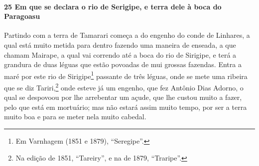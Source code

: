 \paragraph{25 Em que se declara o rio de Serigipe, e terra dele à boca do Paragoasu}

Partindo com a terra de Tamarari começa a do engenho do conde de Linhares, a qual está
muito metida para dentro fazendo uma maneira de enseada, a que chamam Mairape, a qual vai
correndo até a boca do rio de Sirigipe, e terá a grandura de duas léguas que estão
povoadas de mui grossas fazendas. Entra a maré por este rio de Sirigipe\footnote{ Em
Varnhagem (1851 e 1879), ``Seregipe''.} passante de três léguas, onde se mete uma ribeira
que se diz Tariri,\footnote{ Na edição de 1851, ``Tareiry'', e na de 1879, ``Traripe''.}
onde esteve já um engenho, que fez Antônio Dias Adorno, o qual se despovoou por lhe
arrebentar um açude, que lhe custou muito a fazer, pelo que está em mortuário;
mas não estará assim muito tempo, por ser a terra muito boa e
para se meter nela muito cabedal.


